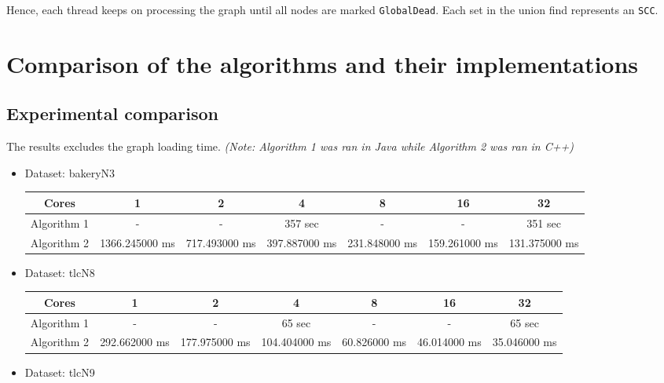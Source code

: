 \documentclass[a4paper]{article}
\begin{document}
Hence, each thread keeps on processing the graph until all nodes are marked \texttt{GlobalDead}.
Each set in the union find represents an \texttt{SCC}.

\section{Comparison of the algorithms and their implementations}

\subsection{Experimental comparison}

The results excludes the graph loading time.
\textit{(Note: Algorithm 1 was ran in Java while Algorithm 2 was ran in C++)}

\begin{itemize}
    \item Dataset: bakeryN3
    \\
    
    \hspace{-4.0cm}
    \begin{tabular}{|c|c|c|c|c|c|c|}
        \hline
        Cores & 1 & 2 & 4 & 8 & 16 & 32 \\
        \hline
        Algorithm 1 & - & - &  357 sec & - & - & 351 sec \\
        \hline
        Algorithm 2 & 1366.245000 ms & 717.493000 ms & 397.887000 ms & 231.848000 ms & 159.261000 ms & 131.375000 ms \\
        \hline
    \end{tabular}
    
    \item Dataset: tlcN8
    \\
    
    \hspace{-4.0cm}
    \begin{tabular}{|c|c|c|c|c|c|c|}
        \hline
        Cores & 1 & 2 & 4 & 8 & 16 & 32 \\
        \hline
        Algorithm 1 & - & - &  65 sec & - & - & 65 sec \\
        \hline
        Algorithm 2 & 292.662000 ms & 177.975000 ms & 104.404000 ms & 60.826000 ms & 46.014000 ms & 35.046000 ms \\
        \hline
    \end{tabular}
    
    \item Dataset: tlcN9
    \\
    

\end{itemize}
\end{document}

